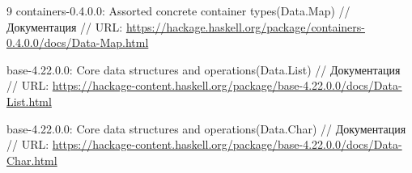 \documentclass[a4paper, 16pt]{article}
\begin{document}
\begin{thebibliography}{9}
containers-0.4.0.0: Assorted concrete container types(Data.Map) // Документация //
URL: \url{https://hackage.haskell.org/package/containers-0.4.0.0/docs/Data-Map.html} 

base-4.22.0.0: Core data structures and operations(Data.List) // Документация //
URL: \url{https://hackage-content.haskell.org/package/base-4.22.0.0/docs/Data-List.html}

base-4.22.0.0: Core data structures and operations(Data.Char) // Документация //
URL: \url{https://hackage-content.haskell.org/package/base-4.22.0.0/docs/Data-Char.html}


\end{thebibliography}
\end{document}
